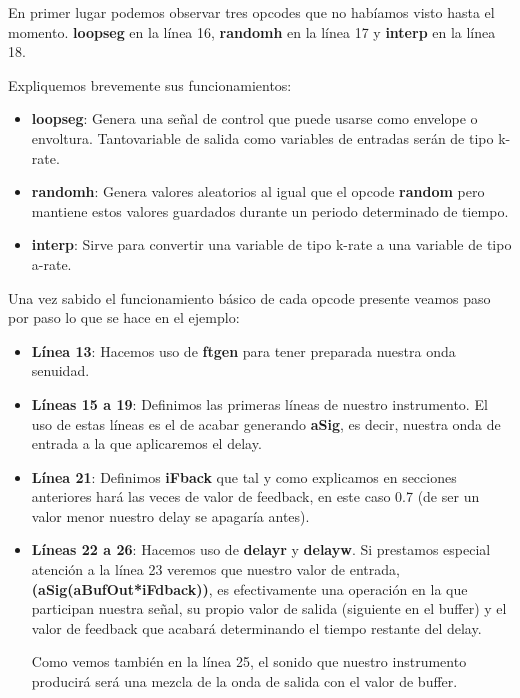 En primer lugar podemos observar tres opcodes que no habíamos visto hasta el momento. \textbf{loopseg} en la línea 16, \textbf{randomh} en la línea 17 y \textbf{interp} en la línea 18. 

Expliquemos brevemente sus funcionamientos:

\begin{itemize}
 \item \textbf{loopseg}: Genera una señal de control que puede usarse como envelope o envoltura. Tantovariable de salida como variables de entradas serán de tipo k-rate.
 \item \textbf{randomh}: Genera valores aleatorios al igual que el opcode \textbf{random} pero mantiene estos valores guardados durante un periodo determinado de tiempo.
 \item \textbf{interp}: Sirve para convertir una variable de tipo k-rate a una variable de tipo a-rate.
\end{itemize}

Una vez sabido el funcionamiento básico de cada opcode presente veamos paso por paso lo que  se hace en el ejemplo:

\begin{itemize}
 \item \textbf{Línea 13}: Hacemos uso de \textbf{ftgen} para tener preparada nuestra onda senuidad.
 \item \textbf{Líneas 15 a 19}: Definimos las primeras líneas de nuestro instrumento. El uso de estas líneas es el de acabar generando \textbf{aSig}, es decir, nuestra onda de entrada a la que aplicaremos el delay.
 \item \textbf{Línea 21}: Definimos \textbf{iFback} que tal y como explicamos en secciones anteriores hará las veces de valor de feedback, en este caso 0.7 (de ser un valor menor nuestro delay se apagaría antes).
 \item \textbf{Líneas 22 a 26}: Hacemos uso de \textbf{delayr} y \textbf{delayw}. Si prestamos especial atención a la línea 23 veremos que nuestro valor de entrada, \textbf{(aSig(aBufOut*iFdback))}, es efectivamente una operación en la que participan nuestra señal, su propio valor de salida (siguiente en el buffer) y el valor de feedback que acabará determinando el tiempo restante del delay.
 
 Como vemos también en la línea 25, el sonido que nuestro instrumento producirá será una mezcla de la onda de salida con el valor de buffer.
\end{itemize}

